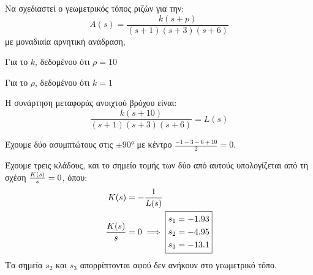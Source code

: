 \documentclass[11pt,a4paper,notitlepage,fleqn,final]{article}
\begin{document}
\begin{exercise}
Να σχεδιαστεί ο γεωμετρικός τόπος ριζών για την:
\[
A(s) = \frac{k(s+p)}{(s+1)(s+3)(s+6)}
\]
με μοναδιαία αρνητική ανάδραση,
\begin{enumgreekpar}
	\item Για το \( k \), δεδομένου ότι \( ρ=10 \)
	\item Για το \( ρ \), δεδομένου ότι \( k=1 \)
\end{enumgreekpar}
\tcblower
\begin{enumgreekpar}
	\item Η συνάρτηση μεταφοράς ανοιχτού βρόχου είναι:\[
	\frac{k(s+10)}{(s+1)(s+3)(s+6)} = L(s)
	\]
	
	Έχουμε δύο ασυμπτώτους στις \( \pm \ang{90} \) με κέντρο \( \frac{-1-3-6+10}{2} = 0 \).
	
    Έχουμε τρεις κλάδους, και το σημείο τομής των δύο από αυτούς υπολογίζεται από τη
    σχέση \( \frac{K(s)}{s} = 0 \), όπου:
    \begin{align*}
    	K(s) &= -\frac{1}{L(s)} \\
    	\frac{K(s)}{s} &= 0 \implies \boxed{\begin{aligned}
    		s_1 &= -1.93 \\ s_2 &= -4.95 \\ s_3 &= -13.1
    		\end{aligned}}
    \end{align*}
    Τα σημεία \( s_2 \) και \( s_3 \) απορρίπτονται αφού δεν ανήκουν στο γεωμετρικό τόπο.
    
\end{enumgreekpar}
\end{exercise}
\end{document}
